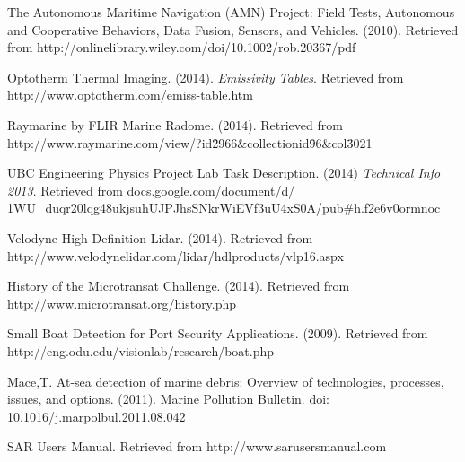 \begin{thebibliography}{999}


 The Autonomous Maritime Navigation (AMN) Project:
Field Tests, Autonomous and Cooperative Behaviors,
Data Fusion, Sensors, and Vehicles. (2010). Retrieved from http://onlinelibrary.wiley.com/doi/10.1002/rob.20367/pdf

 Optotherm Thermal Imaging. (2014). \textit{Emissivity Tables}. Retrieved from http://www.optotherm.com/emiss-table.htm

 Raymarine by FLIR Marine Radome. (2014). Retrieved from http://www.raymarine.com/view/?id\=2966\&collectionid\=96\&col\=3021

 UBC Engineering Physics Project Lab Task Description. (2014) \textit{Technical Info 2013}. Retrieved from docs.google.com/document/d/\\1WU\_duqr20lqg48ukjsuhUJPJhsSNkrWiEVf3uU4xS0A/pub\#h.f2e6v0ormnoc

 Velodyne High Definition Lidar. (2014). Retrieved from http://www.velodynelidar.com/lidar/hdlproducts/vlp16.aspx

 History of the Microtransat Challenge. (2014). Retrieved from http://www.microtransat.org/history.php

 Small Boat Detection for Port Security Applications. (2009). Retrieved from http://eng.odu.edu/visionlab/research/boat.php

 Mace,T. At-sea detection of marine debris: Overview of technologies, processes, issues, and options. (2011). Marine Pollution Bulletin. doi: 10.1016/j.marpolbul.2011.08.042

 SAR Users Manual. Retrieved from http://www.sarusersmanual.com

\end{thebibliography}